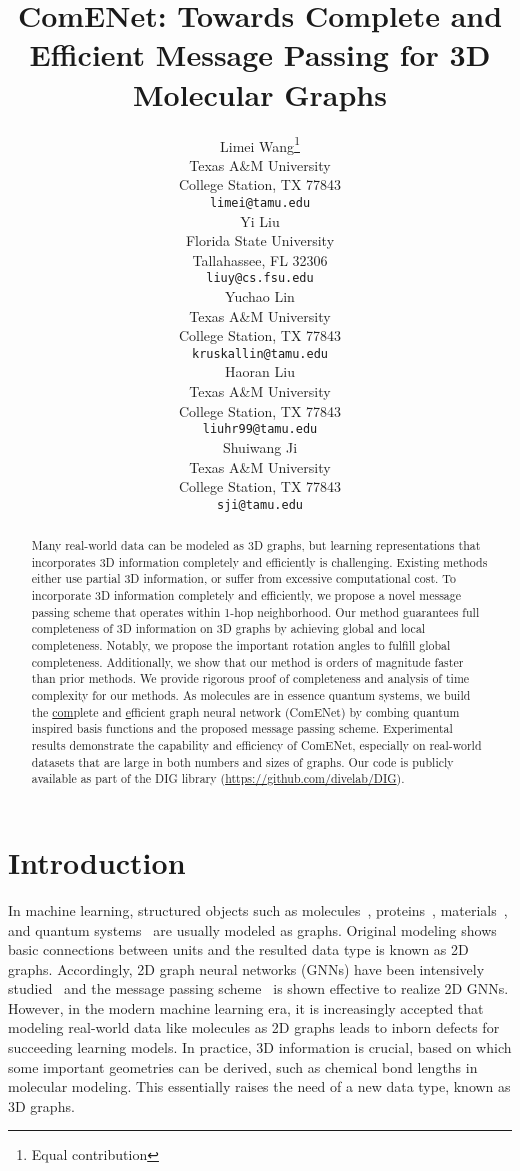 \documentclass{article}
\title{ComENet: Towards Complete and Efficient Message Passing for 3D Molecular Graphs}
\author{Limei Wang\thanks{Equal contribution} \\
  Texas A\&M University\\
  College Station, TX 77843 \\
  \texttt{limei@tamu.edu} \\
   \And
   Yi Liu\footnotemark[1] \\
  Florida State University\\
  Tallahassee, FL 32306 \\
   \texttt{liuy@cs.fsu.edu} \\
   \AND
   Yuchao Lin \\
  Texas A\&M University\\
  College Station, TX 77843 \\
   \texttt{kruskallin@tamu.edu} \\
   \And
   Haoran Liu\\
  Texas A\&M University\\
  College Station, TX 77843 \\
   \texttt{liuhr99@tamu.edu} \\
   \AND
   Shuiwang Ji \\
  Texas A\&M University\\
  College Station, TX 77843 \\
   \texttt{sji@tamu.edu} \\
}
\begin{document}
\maketitle


\begin{abstract}
Many real-world data can be modeled as 3D graphs, 
but learning representations that incorporates 3D information completely and efficiently is challenging. Existing methods either use partial 3D information, 
or suffer from excessive computational cost.
To incorporate 3D information completely and efficiently,
we propose a novel message passing scheme that operates within 1-hop neighborhood.
Our method guarantees full completeness of 3D information on 3D graphs by achieving global
and local completeness.
Notably, we propose the important rotation angles 
to fulfill global completeness.
Additionally, we show that our method is orders of magnitude faster than prior methods.
We provide rigorous proof of completeness
and analysis of time complexity for our methods.
As molecules are in essence quantum systems, 
we
build the \underline{com}plete and \underline{e}fficient graph neural network (ComENet) by combing quantum inspired basis functions and the proposed message passing scheme.
Experimental results demonstrate the capability and efficiency of ComENet, especially on real-world
datasets that are large in both numbers and sizes of graphs.
Our code is publicly available
as part of the DIG library (\url{https://github.com/divelab/DIG}).
\end{abstract}


\section{Introduction}
In machine learning, structured objects such as molecules~\citep{duvenaud2015convolutional,wu2018moleculenet, wang2022advanced}, proteins~\citep{borgwardt2005protein,fout2017protein,liu2020deep,morehead2021geometric,jumper2021highly}, materials~\citep{xie2018crystal}, and quantum systems~\citep{kochkov2021learning, fu2022lattice} are usually modeled as graphs.
Original modeling shows basic connections between units and the resulted data type is known as 2D graphs. Accordingly, 2D graph neural networks (GNNs) have been intensively studied~\citep{duvenaud2015convolutional,gao2020topology,gao2018graph,xu2018powerful,zhang2018end,liu2021dig} 
and the message passing scheme~\citep{gilmer2017neural,battaglia2018relational,vignac2020building}
is shown effective to realize 2D GNNs.
However, in the modern machine learning era, it is increasingly accepted that modeling real-world data like molecules as 2D graphs leads to inborn defects for succeeding learning models.
In practice, 3D information is crucial, based on which some important geometries can be derived,
such as chemical bond lengths in 
molecular modeling. This essentially raises the need of a new data type, known as 3D graphs. 
\end{document}
